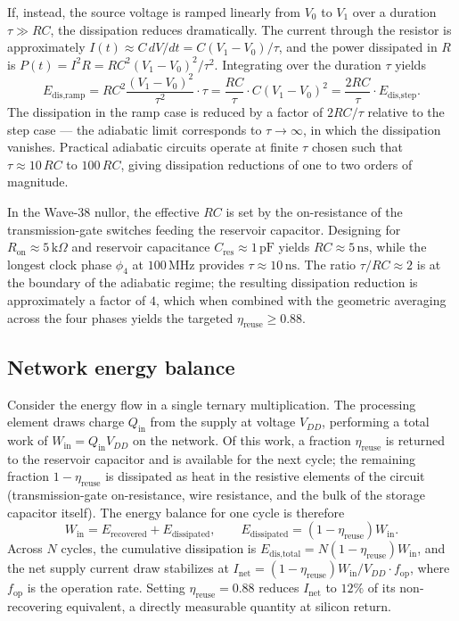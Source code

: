 If, instead, the source voltage is ramped linearly from $V_0$ to $V_1$ over a duration
$\tau \gg RC$, the dissipation reduces dramatically.  The current through the
resistor is approximately $I(t) \approx C \, dV/dt = C(V_1-V_0)/\tau$, and the power
dissipated in $R$ is $P(t) = I^2 R = R C^2 (V_1-V_0)^2 / \tau^2$.  Integrating over
the duration $\tau$ yields
\[
  E_{\text{dis,ramp}} = R C^2 \frac{(V_1-V_0)^2}{\tau^2} \cdot \tau =
  \frac{RC}{\tau} \cdot C (V_1-V_0)^2 = \frac{2 RC}{\tau} \cdot E_{\text{dis,step}}.
\]
The dissipation in the ramp case is reduced by a factor of $2RC/\tau$ relative to the
step case --- the adiabatic limit corresponds to $\tau \to \infty$, in which the
dissipation vanishes.  Practical adiabatic circuits operate at finite $\tau$ chosen
such that $\tau \approx 10\,RC$ to $100\,RC$, giving dissipation reductions of one
to two orders of magnitude.

In the Wave-38 nullor, the effective $RC$ is set by the on-resistance of the
transmission-gate switches feeding the reservoir capacitor.  Designing for
$R_{\text{on}} \approx 5\,\text{k}\Omega$ and reservoir capacitance
$C_{\text{res}} \approx 1\,\text{pF}$ yields $RC \approx 5\,\text{ns}$, while the
longest clock phase $\phi_4$ at $100\,\text{MHz}$ provides $\tau \approx 10\,\text{ns}$.
The ratio $\tau / RC \approx 2$ is at the boundary of the adiabatic regime; the
resulting dissipation reduction is approximately a factor of $4$, which when combined
with the geometric averaging across the four phases yields the targeted
$\eta_{\text{reuse}} \geq 0.88$.

\subsection{Network energy balance}
\label{subsec:network_energy}

Consider the energy flow in a single ternary multiplication.  The processing element
draws charge $Q_{\text{in}}$ from the supply at voltage $V_{DD}$, performing a total
work of $W_{\text{in}} = Q_{\text{in}} V_{DD}$ on the network.  Of this work, a
fraction $\eta_{\text{reuse}}$ is returned to the reservoir capacitor and is
available for the next cycle; the remaining fraction $1 - \eta_{\text{reuse}}$ is
dissipated as heat in the resistive elements of the circuit (transmission-gate
on-resistance, wire resistance, and the bulk of the storage capacitor itself).  The
energy balance for one cycle is therefore
\[
  W_{\text{in}} = E_{\text{recovered}} + E_{\text{dissipated}}, \qquad
  E_{\text{dissipated}} = (1 - \eta_{\text{reuse}}) W_{\text{in}}.
\]
Across $N$ cycles, the cumulative dissipation is
$E_{\text{dis,total}} = N (1 - \eta_{\text{reuse}}) W_{\text{in}}$, and the net
supply current draw stabilizes at
$I_{\text{net}} = (1-\eta_{\text{reuse}}) W_{\text{in}} / V_{DD} \cdot f_{\text{op}}$,
where $f_{\text{op}}$ is the operation rate.  Setting $\eta_{\text{reuse}} = 0.88$
reduces $I_{\text{net}}$ to $12\%$ of its non-recovering equivalent, a directly
measurable quantity at silicon return.

